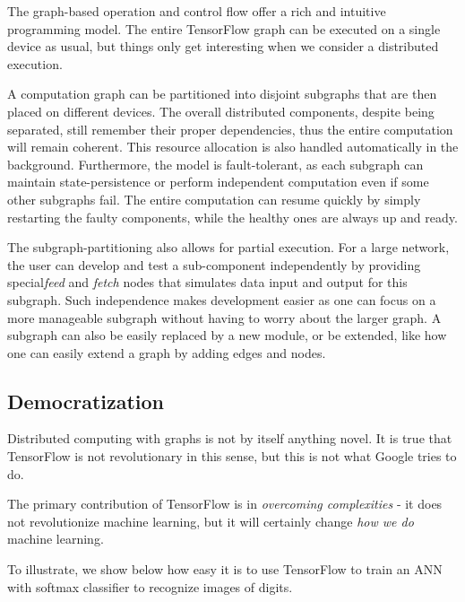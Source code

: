 \documentclass[12pt]{article}  %
\begin{document}
The graph-based operation and control flow offer a rich and intuitive programming model. The entire TensorFlow graph can be executed on a single device as usual, but things only get interesting when we consider a distributed execution.

A computation graph can be partitioned into disjoint subgraphs that are then placed on different devices. The overall distributed components, despite being separated, still remember their proper dependencies, thus the entire computation will remain coherent. This resource allocation is also handled automatically in the background. Furthermore, the model is fault-tolerant, as each subgraph can maintain state-persistence or perform independent computation even if some other subgraphs fail. The entire computation can resume quickly by simply restarting the faulty components, while the healthy ones are always up and ready.

The subgraph-partitioning also allows for partial execution. For a large network, the user can develop and test a sub-component independently by providing special\emph{feed} and \emph{fetch} nodes that simulates data input and output for this subgraph. Such independence makes development easier as one can focus on a more manageable subgraph without having to worry about the larger graph. A subgraph can also be easily replaced by a new module, or be extended, like how one can easily extend a graph by adding edges and nodes.


\subsection{Democratization}
Distributed computing with graphs is not by itself anything novel. It is true that TensorFlow is not revolutionary in this sense, but this is not what Google tries to do.

The primary contribution of TensorFlow is in \emph{overcoming complexities} - it does not revolutionize machine learning, but it will certainly change \emph{how we do} machine learning.

To illustrate, we show below how easy it is to use TensorFlow to train an ANN with softmax classifier to recognize images of digits.
\end{document}
